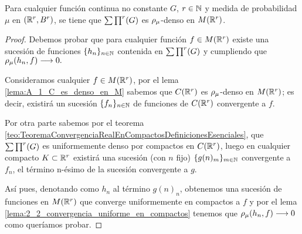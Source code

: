 %

\begin{teorema}\label{teo:2_2_denso_función_continua}
    Para cualquier función continua no constante $G$, $r \in \mathbb{N}$ y
    medida de probabilidad $\mu$ en $(\mathbb{R}^r, B^r)$, 
    se tiene que $\sum \prod^r (G)$ es $\rho_{\mu}$-denso en $M(\mathbb{R}^r)$. 
\end{teorema} 
\begin{proof}
    Debemos probar que para cualquier función $f \in M(\mathbb{R}^r)$ existe una 
    sucesión de funciones $\{h_n\}_{n\in \mathbb{N}}$ contenida en $\sum \prod^r (G)$ y 
    cumpliendo que $\rho_{\mu}(h_n, f) \longrightarrow 0.$

    Consideramos cualquier $f \in M(\mathbb{R}^r)$,
    por el lema \ref{lema:A_1_C_es_denso_en_M} sabemos que $C(\mathbb{R}^r)$ es $\rho_{\mu}$-denso en $M(\mathbb{R}^r)$; 
    es decir, existirá un sucesión $\{f_n\}_{n\in \mathbb{N}}$ de funciones de $C(\mathbb{R}^r)$ convergente a 
    $f$.  
    
    Por otra parte sabemos por el teorema \ref{teo:TeoremaConvergenciaRealEnCompactosDefinicionesEsenciales}, 
    que $\sum \prod^r (G)$ es uniformemente denso por compactos en $C(\mathbb{R}^r)$, luego en cualquier compacto 
    $K \subset \mathbb{R}^r$ existirá una sucesión (con $n$ fijo) $\{g(n)_m \} _{m \in \mathbb{N}}$ convergente 
    a $f_n$, el término n-ésimo de la sucesión convergente a $g$. 

    Así pues, denotando como $h_n$ al término $g(n)_n$, obtenemos una sucesión de funciones 
    en $M(\mathbb{R}^r)$ que converge uniformemente en compactos a $f$ y por el lema \ref{lema:2_2_convergencia_uniforme_en_compactos}
    tenemos que $\rho_{\mu}(h_n, f) \longrightarrow 0$ como queríamos probar.     
\end{proof}

